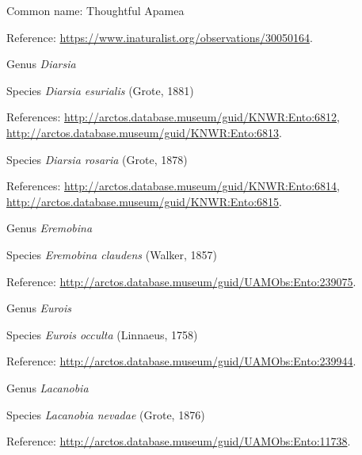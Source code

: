 \documentclass[9pt, article]{memoir}
\begin{document}
\begin{multicols}{2}
Common name: Thoughtful Apamea

Reference: 
\url{https://www.inaturalist.org/observations/30050164}.

\vspace{6pt}\noindent\hspace{30pt}Genus \textit{Diarsia}


\vspace{6pt}\noindent\hspace{36pt}Species \textit{Diarsia esurialis} (Grote, 1881)


References: 
\url{http://arctos.database.museum/guid/KNWR:Ento:6812}, 
\url{http://arctos.database.museum/guid/KNWR:Ento:6813}.

\vspace{6pt}\noindent\hspace{36pt}Species \textit{Diarsia rosaria} (Grote, 1878)


References: 
\url{http://arctos.database.museum/guid/KNWR:Ento:6814}, 
\url{http://arctos.database.museum/guid/KNWR:Ento:6815}.

\vspace{6pt}\noindent\hspace{30pt}Genus \textit{Eremobina}


\vspace{6pt}\noindent\hspace{36pt}Species \textit{Eremobina claudens} (Walker, 1857)


Reference: 
\url{http://arctos.database.museum/guid/UAMObs:Ento:239075}.

\vspace{6pt}\noindent\hspace{30pt}Genus \textit{Eurois}


\vspace{6pt}\noindent\hspace{36pt}Species \textit{Eurois occulta} (Linnaeus, 1758)


Reference: 
\url{http://arctos.database.museum/guid/UAMObs:Ento:239944}.

\vspace{6pt}\noindent\hspace{30pt}Genus \textit{Lacanobia}


\vspace{6pt}\noindent\hspace{36pt}Species \textit{Lacanobia nevadae} (Grote, 1876)


Reference: 
\url{http://arctos.database.museum/guid/UAMObs:Ento:11738}.


\end{multicols}
\end{document}
